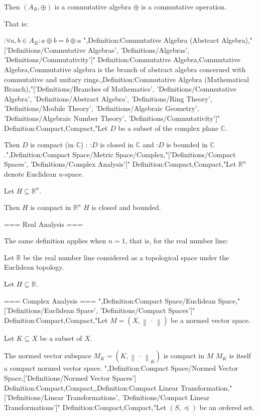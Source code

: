 Then $\left( A_R, \oplus \right)$ is a commutative algebra  $\oplus$ is a commutative operation.

That is:

:$\forall a, b \in A_R: a \oplus b = b \oplus a$
",Definition:Commutative Algebra (Abstract Algebra),"['Definitions/Commutative Algebras', 'Definitions/Algebras', 'Definitions/Commutativity']"
Definition:Commutative Algebra,Commutative Algebra,Commutative algebra is the branch of abstract algebra concerned with commutative and unitary rings.,Definition:Commutative Algebra (Mathematical Branch),"['Definitions/Branches of Mathematics', 'Definitions/Commutative Algebra', 'Definitions/Abstract Algebra', 'Definitions/Ring Theory', 'Definitions/Module Theory', 'Definitions/Algebraic Geometry', 'Definitions/Algebraic Number Theory', 'Definitions/Commutativity']"
Definition:Compact,Compact,"Let $D$ be a subset of the complex plane $\mathbb C$.


Then $D$ is compact (in $\mathbb C$) :
:$D$ is closed in $\mathbb C$
and
:$D$ is bounded in $\mathbb C$.",Definition:Compact Space/Metric Space/Complex,"['Definitions/Compact Spaces', 'Definitions/Complex Analysis']"
Definition:Compact,Compact,"Let $\mathbb R^n$ denote Euclidean $n$-space.

Let $H \subseteq \mathbb R^n$.


Then $H$ is compact in $\mathbb R^n$  $H$ is closed and bounded.


=== Real Analysis ===

The same definition applies when $n = 1$, that is, for the real number line:

Let $\mathbb R$ be the real number line considered as a topological space under the Euclidean topology.

Let $H \subseteq \mathbb R$.



=== Complex Analysis ===
",Definition:Compact Space/Euclidean Space,"['Definitions/Euclidean Space', 'Definitions/Compact Spaces']"
Definition:Compact,Compact,"Let $M = \left( X, \left\lVert \,\cdot\, \right\rVert \right)$ be a normed vector space.

Let $K \subseteq X$ be a subset of $X$.


The normed vector subspace $M_K = \left( K, \left\lVert \,\cdot\, \right\rVert_K \right)$ is compact in $M$  $M_K$ is itself a compact normed vector space.
",Definition:Compact Space/Normed Vector Space,['Definitions/Normed Vector Spaces']
Definition:Compact,Compact,,Definition:Compact Linear Transformation,"['Definitions/Linear Transformations', 'Definitions/Compact Linear Transformations']"
Definition:Compact,Compact,"Let $\left( S, \preceq \right)$ be an ordered set.

